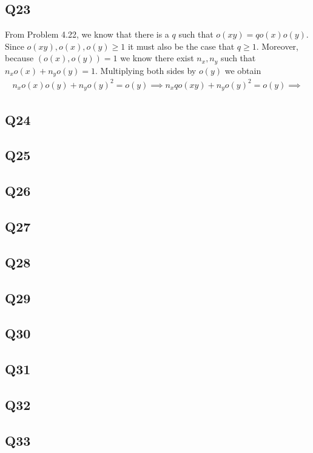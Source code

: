 \documentclass[12pt]{article}
\numberwithin{theorem}{section}
\numberwithin{equation}{section}
\numberwithin{remark}{section}
\numberwithin{definition}{section}
\numberwithin{theorem}{section}
\numberwithin{lemma}{section}
\numberwithin{example}{section}
\begin{document}
\subsection{Q23}

From Problem 4.22, we know that there is a $q$ such that $o(xy)=qo(x)o(y)$. Since $o(xy),o(x),o(y)\ge1$ it must also be the case that $q\ge1$. Moreover, because $(o(x),o(y))=1$ we know there exist $n_x,n_y$ such that $n_xo(x)+n_yo(y)=1$. Multiplying both sides by $o(y)$ we obtain
\begin{align*}
	n_xo(x)o(y)+n_yo(y)^2=o(y) \implies n_xqo(xy)+n_yo(y)^2=o(y) \implies 
\end{align*}



\subsection{Q24}

\subsection{Q25}

\subsection{Q26}

\subsection{Q27}

\subsection{Q28}

\subsection{Q29}

\subsection{Q30}

\subsection{Q31}

\subsection{Q32}

\subsection{Q33}
\end{document}
